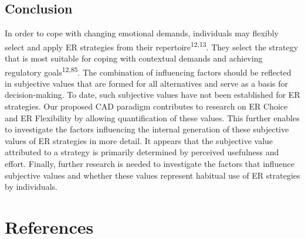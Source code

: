 \documentclass[
  man,floatsintext]{apa6}
\begin{document}
\hypertarget{conclusion}{%
\subsection{Conclusion}\label{conclusion}}

In order to cope with changing emotional demands, individuals may flexibly select and apply ER strategies from their repertoire\textsuperscript{12,13}.
They select the strategy that is most suitable for coping with contextual demands and achieving regulatory goals\textsuperscript{12,85}.
The combination of influencing factors should be reflected in subjective values that are formed for all alternatives and serve as a basis for decision-making.
To date, such subjective values have not been established for ER strategies.
Our proposed CAD paradigm contributes to research on ER Choice and ER Flexibility by allowing quantification of these values.
This further enables to investigate the factors influencing the internal generation of these subjective values of ER strategies in more detail.
It appears that the subjective value attributed to a strategy is primarily determined by perceived usefulness and effort.
Finally, further research is needed to investigate the factors that influence subjective values and whether these values represent habitual use of ER strategies by individuals.

\hypertarget{references}{%
\section{References}\label{references}}

\begingroup
\setlength{\parindent}{-0.5in}
\setlength{\leftskip}{0.5in}
\end{document}
